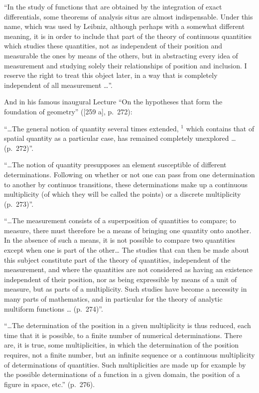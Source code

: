 ``In the study of functions that are obtained by the integration of exact differentials, some theorems of analysis situs are almost indispensable. Under this name, which was used by Leibniz, although perhaps with a somewhat different meaning, it is in order to include that part of the theory of continuous quantities which studies these quantities, not as independent of their position and measurable the ones by means of the others, but in abstracting every idea of measurement and studying solely their relationships of position and inclusion. I reserve the right to treat this object later, in a way that is completely independent of all measurement \ldots{}''.

And in his famous inaugural Lecture ``On the hypotheses that form the foundation of geometry'' ({[}259 a{]}, p.~272):

``\ldots The general notion of quantity several times extended, \(^{1}\) which contains that of spatial quantity as a particular case, has remained completely unexplored \ldots{} (p.~272)''.

``\ldots The notion of quantity presupposes an element susceptible of different determinations. Following on whether or not one can pass from one determination to another by continuos transitions, these determinations make up a continuous multiplicity (of which they will be called the points) or a discrete multiplicity (p.~273)''.

``\ldots The measurement consists of a superposition of quantities to compare; to measure, there must therefore be a means of bringing one quantity onto another. In the absence of such a means, it is not possible to compare two quantities except when one is part of the other\ldots{} The studies that can then be made about this subject constitute part of the theory of quantities, independent of the measurement, and where the quantities are not considered as having an existence independent of their position, nor as being expressible by means of a unit of measure, but as parts of a multiplicity. Such studies have become a necessity in many parts of mathematics, and in particular for the theory of analytic multiform functions \ldots{} (p.~274)''.

``\ldots The determination of the position in a given multiplicity is thus reduced, each time that it is possible, to a finite number of numerical determinations. There are, it is true, some multiplicities, in which the determination of the position requires, not a finite number, but an infinite sequence or a continuous multiplicity of determinations of quantities. Such multiplicities are made up for example by the possible determinations of a function in a given domain, the position of a figure in space, etc.'' (p.~276).

